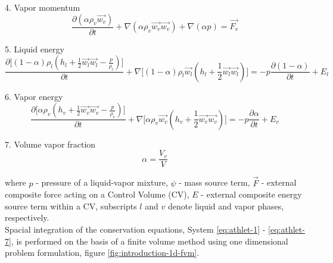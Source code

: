4. Vapor momentum
\begin{equation} \label{eq:athlet-4}
\frac{\partial (\alpha \rho_{v} \vec{w_{v}})}{\partial t} + \nabla (\alpha \rho_{v} \vec{w_{v}} \vec{w_{v}}) + \nabla (\alpha p) = \vec{F_{v}}
\end{equation}


5. Liquid energy
\begin{equation} \label{eq:athlet-5}
\frac{\partial \Big[ (1-\alpha)\rho_{l}(h_{l} + \frac{1}{2} \vec{w_{l}} \vec{w_{l}} - \frac{p}{\rho_{l}}) \Big]}{\partial t} + \nabla \Big[ (1-\alpha)\rho_{l}\vec{w_{l}}(h_{l} + \frac{1}{2} \vec{w_{l}} \vec{w_{l}}) \Big] = - p \frac{\partial (1 - \alpha)}{\partial t} + E_{l}
\end{equation}


6. Vapor energy
\begin{equation} \label{eq:athlet-6}
\frac{\partial \Big[ \alpha \rho_{v}(h_{v} + \frac{1}{2} \vec{w_{v}} \vec{w_{v}} - \frac{p}{\rho_{v}}) \Big]}{\partial t} + \nabla \Big[ \alpha\rho_{v}\vec{w_{v}}(h_{v} + \frac{1}{2} \vec{w_{v}} \vec{w_{v}}) \Big] = - p \frac{\partial \alpha}{\partial t} + E_{v}
\end{equation}

7. Volume vapor fraction
\begin{equation} \label{eq:athlet-7}
	\alpha = \frac{V_{v}}{V}
\end{equation}


where $p$ - pressure of a liquid-vapor mixture, $\psi$ - mass source term, $\vec{F}$ - external composite force acting on a Control Volume (CV), $E$ - external composite energy source term within a CV, subscripts $l$ and $v$ denote liquid and vapor phases, respectively. \\


Spacial integration of the conservation equations, System \ref{eq:athlet-1} - \ref{eq:athlet-7}, is performed on the basis of a finite volume method using one dimensional problem formulation, figure \ref{fig:introduction-1d-fvm}.


